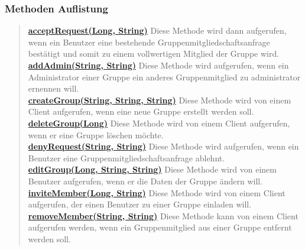 \documentclass[11pt,a4paper]{article}
\begin{document}
{{{{{{{{{{{{{{{{{{\subsubsection{Methoden Auflistung}{
\begin{verse}
\hyperlink{edu.kit.pse17.go_app.ClientCommunication.Upstream.GroupRestController.acceptRequest(java.lang.Long, java.lang.String)}{{\bf acceptRequest(Long, String)}} Diese Methode wird dann aufgerufen, wenn ein Benutzer eine bestehende Gruppenmitgliedschaftsanfrage bestätigt und somit zu einem vollwertigen Mitglied der Gruppe wird.\\
\hyperlink{edu.kit.pse17.go_app.ClientCommunication.Upstream.GroupRestController.addAdmin(java.lang.String, java.lang.String)}{{\bf addAdmin(String, String)}} Diese Methode wird aufgerufen, wenn ein Administrator einer Gruppe ein anderes Gruppenmitglied zu administrator ernennen will.\\
\hyperlink{edu.kit.pse17.go_app.ClientCommunication.Upstream.GroupRestController.createGroup(java.lang.String, java.lang.String, java.lang.String)}{{\bf createGroup(String, String, String)}} Diese Methode wird von einem Client aufgerufen, wenn eine neue Gruppe erstellt werden soll.\\
\hyperlink{edu.kit.pse17.go_app.ClientCommunication.Upstream.GroupRestController.deleteGroup(java.lang.Long)}{{\bf deleteGroup(Long)}} Diese Methode wird von einem Client aufgerufen, wenn er eine Gruppe löschen möchte.\\
\hyperlink{edu.kit.pse17.go_app.ClientCommunication.Upstream.GroupRestController.denyRequest(java.lang.String, java.lang.String)}{{\bf denyRequest(String, String)}} Diese Methode wird aufgerufen, wenn ein Benutzer eine Gruppenmitgliedschaftsanfrage ablehnt.\\
\hyperlink{edu.kit.pse17.go_app.ClientCommunication.Upstream.GroupRestController.editGroup(java.lang.Long, java.lang.String, java.lang.String)}{{\bf editGroup(Long, String, String)}} Diese Methode wird von einem Benutzer aufgerufen, wenn er die Daten der Gruppe ändern will.\\
\hyperlink{edu.kit.pse17.go_app.ClientCommunication.Upstream.GroupRestController.inviteMember(java.lang.Long, java.lang.String)}{{\bf inviteMember(Long, String)}} Diese Methode wird von einem Client aufgerufen, der einen Benutzer zu einer Gruppe einladen will.\\
\hyperlink{edu.kit.pse17.go_app.ClientCommunication.Upstream.GroupRestController.removeMember(java.lang.String, java.lang.String)}{{\bf removeMember(String, String)}} Diese Methode kann von einem Client aufgerufen werden, wenn ein Gruppenmitglied aus einer Gruppe entfernt werden soll.\\
\end{verse}
}
}}}}}}}}}}}}}}}}}}
\end{document}
